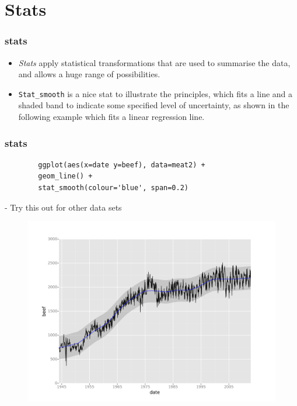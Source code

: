 \documentclass{beamer}
\begin{document}
\section{Stats}
\begin{frame}
	\frametitle{stats}
	\Large
	\begin{itemize}
		\item \textit{Stats} apply statistical transformations that are used to summarise the data, and allows a huge range of possibilities.\smallskip \item \texttt{Stat\_smooth} is a nice stat to illustrate the principles, which fits a line and a shaded band to indicate some specified level of uncertainty, as shown in the following example which fits a linear regression line.
	\end{itemize}
\end{frame}
\begin{frame}[fragile]
	\frametitle{stats}
	\large
	\vspace{-1.5cm}
	\begin{framed}
		\begin{verbatim}
		ggplot(aes(x=date y=beef), data=meat2) +
		geom_line() +
		stat_smooth(colour='blue', span=0.2)
		\end{verbatim}
	\end{framed}
	\noindent - Try this out for other data sets
\end{frame}
\begin{frame}
	\begin{figure}
		\centering
		\includegraphics[width=1.1\linewidth]{stats1}
	\end{figure}
\end{frame}
\end{document}

